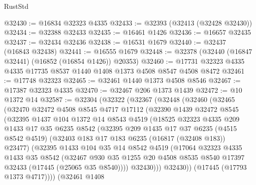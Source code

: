 \begin{lexlean}{RustStd}
\begin{coremodule}
@32430 := @16834 @32323 @4335
@32433 := @32393 (@32413 (@32428 @32430))
@32434 := @32388 @32433
@32435 := @16461 @1426
@32436 := @16657 @32435
@32437 := @32434 @32436
@32438 := @16531 @1679
@32440 := @32437 (@16843 @32438)
@32441 := @16555 @1679
@32448 := @32378 (@32440 (@16847 @32441) (@16852 (@16854 @1426)) @20353)
@32460 := @17731 @32323 @4335 @4335 @17735 @8537 @1440 @1408 @1373 @4508 @8547 @4508 @8472
@32461 := @17748 @32323
@32465 := @32461 @1440 @1373 @4508 @8546
@32467 := @17387 @32323 @4335
@32470 := @32467 @206 @1373 @1439
@32472 := @10 @1372 @14
@32587 := @32304
    (@32322
      (@32367
        (@32448
          (@32460
            (@32465
              (@32470
                @32472
                @4508
                @8545
                @4717
                @17112
                (@32390
                  @1439
                  @32472
                  @8545
                  (@32395
                    @1437
                    @104
                    @1372
                    @14
                    @8543
                    @4519
                    (@18525
                      @32323
                      @4335
                      @209
                      @1433
                      @17
                      @35
                      @6235
                      @8542
                      (@32395
                        @209
                        @1435
                        @17
                        @37
                        @6235
                        (@4515 @8542 @4519)
                        (@32403 @183 @17 @183 @6235 (@16817 (@32408 @183)) @23477)
                        (@32395
                          @1433
                          @104
                          @35
                          @14
                          @8542
                          @4519
                          (@17064
                            @32323
                            @4335
                            @1433
                            @35
                            @8542
                            (@32467
                              @930
                              @35
                              @1255
                              @20
                              @4508
                              @8535
                              @8540
                              @17397
                              @32433
                              (@17445 (@25065 @35 @8540))))
                          @32430)))
                    @32430))
                (@17445 (@17793 @1373 @4717))))
            (@32461
              @1408

\end{coremodule}
\end{lexlean}
